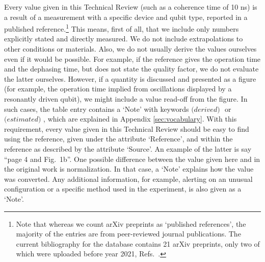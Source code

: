 \documentclass[aps, prx, showpacs, twocolumn, superscriptaddress, notitlepage, longbibliography, floatfix, nofootinbib]{revtex4-2}
\newcommand{\estimated}{\textit{(estimated) }}
\newcommand{\derived}{\textit{(derived) }}
\newcommand{\myKey}[1]{$\whitearrowupfrombar$\textit{#1}}
\renewcommand{\myKey}[1]{\textit{#1}}
\renewcommand{\myKey}[1]{`{#1}'}
\newcommand{\recheck}[1]{{#1}}
\begin{document}
Every value given in this Technical Review (such as a coherence time of 10 ns) is a result of a measurement with a specific device and qubit type, reported in a published reference.\footnote{\recheck{Note that whereas we count arXiv preprints as `published references', the majority of the entries are from peer-reviewed journal publications. The current bibliography for the database contains 21 arXiv preprints, only two of which were uploaded before year 2021, Refs.~\cite{hayes_lifetime_2009,cerfontaine_feedback-tuned_2016}.}} This means, first of all, that we include only numbers explicitly stated and directly measured. We do not include extrapolations to other conditions or materials. Also, we do not usually derive the values ourselves even if it would be possible. For example, if the reference gives the operation time and the dephasing time, but does not state the quality factor, we do not evaluate the latter ourselves. However, if a quantity is discussed and presented as a figure (for example, the operation time implied from oscillations displayed by a resonantly driven qubit), we might include a value read-off from the figure. In such cases, the table entry contains a \myKey{Note} with keywords $\derived$\! or $\estimated$\!, which are explained in Appendix \ref{sec:vocabulary}. With this requirement, every value given in this Technical Review should be easy to find using the reference, given under the attribute \myKey{Reference}, and within the reference as described by the attribute \myKey{Source}. An example of the latter is say ``page 4 and Fig.~1b''. One possible difference between the value given here and in the original work is normalization. In that case, a \myKey{Note} explains how the value was converted. Any additional information, for example, alerting on an unusual configuration or a specific method used in the experiment, is also given as a \myKey{Note}. 
\end{document}
